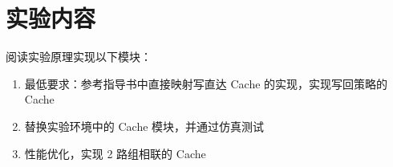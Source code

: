 \section{实验内容}
阅读实验原理实现以下模块：
\begin{enumerate}[(1)]
    \item 最低要求：参考指导书中直接映射写直达 Cache 的实现，实现写回策略的 Cache
    \item 替换实验环境中的 Cache 模块，并通过仿真测试
    \item 性能优化，实现 2 路组相联的 Cache
\end{enumerate}